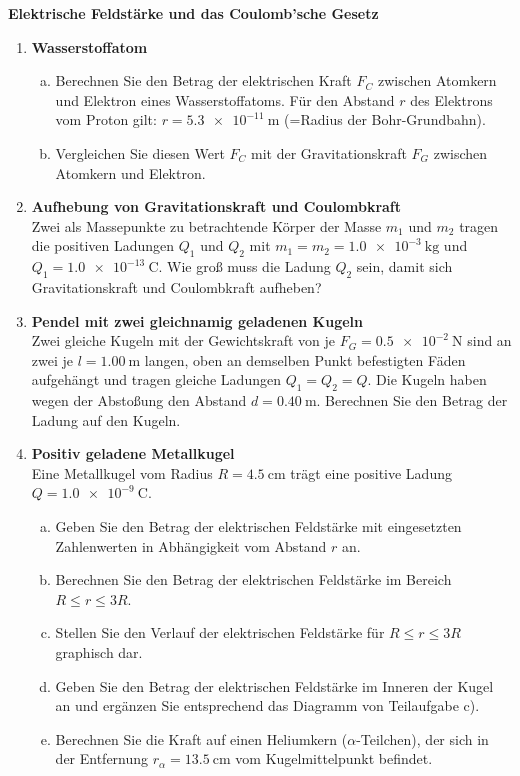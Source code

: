 \documentclass[a4paper]{article}
\begin{document}
{\bf Elektrische Feldstärke und das Coulomb'sche Gesetz }\\
\begin{enumerate}[1.]

\item {\bf Wasserstoffatom}
\begin{enumerate}[a)]
\item Berechnen Sie den Betrag der elektrischen Kraft $F_C$ zwischen Atomkern und Elektron eines Wasserstoffatoms. Für den Abstand $r$ des Elektrons vom Proton gilt: $r=\SI{5,3e-11}{\meter}$ (=Radius der Bohr-Grundbahn).
\item Vergleichen Sie diesen Wert $F_C$ mit der Gravitationskraft $F_G$ zwischen Atomkern und Elektron.
\end{enumerate}

\item {\bf Aufhebung von Gravitationskraft und Coulombkraft}\\
Zwei als Massepunkte zu betrachtende Körper der Masse $m_1$ und $m_2$ tragen die positiven Ladungen $Q_1$ und $Q_2$ mit $m_1=m_2=\SI{1,0e-3}{\kilogram} $ und \\
$Q_1= \SI{1,0e-13}{\coulomb}$. Wie groß muss die Ladung $Q_2$ sein, damit sich Gravitationskraft und Coulombkraft aufheben?

\item {\bf Pendel mit zwei gleichnamig geladenen Kugeln}\\
Zwei gleiche Kugeln mit der Gewichtskraft von je $F_G=\SI{0,5e-2}{\newton}$ sind an zwei je 
$l=\SI{1,00}{\meter}$ langen, oben an demselben Punkt befestigten Fäden aufgehängt und tragen gleiche Ladungen $Q_1=Q_2=Q$. Die Kugeln haben wegen der Abstoßung den Abstand $d=\SI{0,40}{\meter}$. Berechnen Sie den Betrag der Ladung auf den Kugeln.

\item {\bf Positiv geladene Metallkugel}\\
Eine Metallkugel vom Radius $R=\SI{4,5}{\centi\meter}$ trägt eine positive Ladung \\ 
$Q=\SI{1,0e-9}{\coulomb}$.
\begin{enumerate}[a)]
\item Geben Sie den Betrag der elektrischen Feldstärke mit eingesetzten Zahlenwerten in Abhängigkeit vom Abstand $r$ an.
\item Berechnen Sie den Betrag der elektrischen Feldstärke im Bereich \\ $R \le r \le 3 R$.
\item Stellen Sie den Verlauf der elektrischen Feldstärke für $R \le r \le 3 R$ graphisch dar.
\item Geben Sie den Betrag der elektrischen Feldstärke im Inneren der Kugel an und ergänzen Sie entsprechend das Diagramm von Teilaufgabe c).
\item Berechnen Sie die Kraft auf einen Heliumkern ($\alpha$-Teilchen), der sich in der Entfernung $r_{\alpha}=\SI{13,5}{\centi\meter}$ vom Kugelmittelpunkt befindet.
\end{enumerate}


\end{enumerate}
\end{document}
